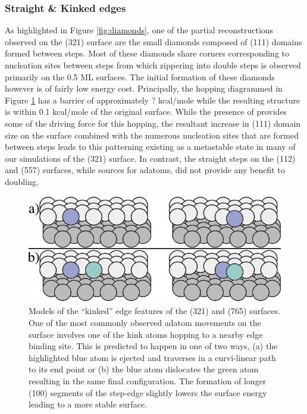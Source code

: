 \subsubsection{Straight \& Kinked edges}
As highlighted in Figure \ref{fig:diamonds}, one of the partial reconstructions
observed on the (321) surface are the small diamonds composed of (111) domains
formed between steps. Most of these diamonds share corners corresponding to
nucleation sites between steps from which zippering into double steps is
observed primarily on the 0.5 ML surfaces. The initial formation of these
diamonds however is of fairly low energy cost. Principally, the hopping
diagrammed in Figure \ref{fig:kinkSketch} has a barrier of approximately ?
kcal/mole while the resulting structure is within 0.1 kcal/mole of the original
surface. While the presence of  provides some of the driving force for
this hopping, the resultant increase in (111) domain size on the surface
combined with the numerous nucleation sites that are formed between steps leads
to this patterning existing as a metastable state in many of our simulations of
the (321) surface. In contrast, the straight steps on the (112) and (557)
surfaces, while sources for adatoms, did not provide any benefit to doubling.

\begin{figure}
  \includegraphics[width=\linewidth]{../figures/chap4/kinkMovement.pdf}
  \caption{Models of the ``kinked'' edge features of the (321) and (765)
surfaces.  One of the most commonly observed adatom movements on the surface
involves one of the kink atoms hopping to a nearby edge binding site. This is
predicted to happen in one of two ways, (a) the highlighted blue atom is
ejected and traverses in a curvi-linear path to its end point or (b) the blue
atom dislocates the green atom resulting in the same final configuration. The
formation of longer (100) segments of the step-edge slightly lowers the surface
energy leading to a more stable surface.}
  \label{fig:kinkSketch}
\end{figure}

